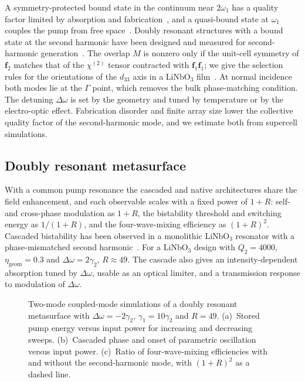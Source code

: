 \documentclass[aps,prapplied,onecolumn,superscriptaddress,longbibliography,nofootinbib]{revtex4-2}
\newcommand{\chitwo}{\chi^{(2)}}
\newcommand{\Dom}{\Delta\omega}
\newcommand{\etag}{\eta_{\mathrm{geom}}}
\newcommand{\f}{\mathbf f}
\newcommand{\figbox}[1]{%
  \fbox{\parbox[c][#1][c]{0.92\linewidth}{\centering\small figure in preparation}}}
\begin{document}
A symmetry-protected bound state in the continuum near $2\omega_1$ has a
quality factor limited by absorption and fabrication~\cite{koshelev2018},
and a quasi-bound state at $\omega_1$ couples the pump from free
space~\cite{carletti2018,koshelev2020}.  Doubly resonant structures with a
bound state at the second harmonic have been designed and measured for
second-harmonic generation~\cite{minkov2019,wang2020}.  The overlap $M$ is
nonzero only if the unit-cell symmetry of $\f_2$ matches that of the
$\chitwo$ tensor contracted with $\f_1\f_1$; we give the selection rules
for the orientations of the $d_{33}$ axis in a LiNbO$_3$
film~\cite{fedotova2020}.  At normal incidence both modes lie at the
$\Gamma$ point, which removes the bulk phase-matching condition.  The
detuning $\Dom$ is set by the geometry and tuned by temperature or by the
electro-optic effect.  Fabrication disorder and finite array size lower
the collective quality factor of the second-harmonic mode, and we estimate
both from supercell simulations.

\subsection{Doubly resonant metasurface}

With a common pump resonance the cascaded and native architectures share
the field enhancement, and each observable scales with a fixed power of
$1+R$: self- and cross-phase modulation as $1+R$, the bistability
threshold and switching energy as $1/(1+R)$, and the four-wave-mixing
efficiency as $(1+R)^2$.  Cascaded bistability has been observed in a
monolithic LiNbO$_3$ resonator with a phase-mismatched second
harmonic~\cite{white1996}.  For a LiNbO$_3$ design with $Q_2=4000$,
$\etag=0.3$ and $\Dom=2\gamma_2$, $R\approx49$.  The cascade also gives an
intensity-dependent absorption tuned by $\Dom$, usable as an optical
limiter, and a transmission response to modulation of $\Dom$.

\begin{figure}[t]
  \centering
  \figbox{4cm}
  \caption{Two-mode coupled-mode simulations of a doubly resonant
    metasurface with $\Dom=-2\gamma_2$, $\gamma_1=10\gamma_2$ and $R=49$.
    (a)~Stored pump energy versus input power for increasing and
    decreasing sweeps.
    (b)~Cascaded phase and onset of parametric oscillation versus input
    power.
    (c)~Ratio of four-wave-mixing efficiencies with and without the
    second-harmonic mode, with $(1+R)^2$ as a dashed line.}
  \label{fig:double}
\end{figure}
\end{document}
